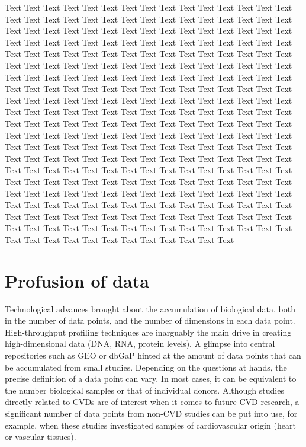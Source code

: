 \documentclass[letter]{bioinfo}
\begin{document}
Text Text Text Text Text Text  Text Text Text Text Text Text Text Text  Text Text Text Text Text Text Text Text  Text Text Text Text Text Text Text Text  Text Text Text Text Text Text Text Text  Text Text Text Text Text Text Text Text  Text Text Text Text Text Text Text Text  Text Text Text Text Text Text Text Text  Text Text Text Text Text Text Text Text  Text Text Text Text Text Text Text Text  Text Text Text Text Text Text Text Text  Text Text Text Text Text Text Text Text  Text Text Text Text Text Text Text Text  Text Text Text Text Text Text Text Text  Text Text Text Text Text Text Text Text  Text Text Text Text Text Text Text Text  Text Text Text Text Text Text Text Text  Text Text Text Text Text Text Text Text  Text Text Text Text Text Text Text Text  Text Text Text Text Text Text Text Text  Text Text Text Text Text Text Text Text  Text Text Text Text Text Text Text Text  Text Text Text Text Text Text Text Text  Text Text Text Text Text Text Text Text  Text Text Text Text Text Text Text Text  Text Text Text Text Text Text Text Text  Text Text Text Text Text Text Text Text  Text Text Text Text Text Text Text Text  Text Text Text Text Text Text Text Text  Text Text Text Text Text Text Text Text  Text Text Text Text Text Text Text Text  Text Text Text Text Text Text Text Text  Text Text Text Text Text Text Text Text  Text Text Text Text Text Text Text Text  Text Text Text Text Text Text Text Text  Text Text Text Text Text Text Text Text  Text Text Text Text Text Text Text Text  Text Text Text Text Text Text Text Text  Text Text Text Text Text Text Text Text  Text Text  

\section{Profusion of data}

Technological advances brought about the accumulation of biological data, both in the number of data points, and the number of dimensions in each data point.
High-throughput profiling techniques are inarguably the main drive in creating high-dimensional data (DNA, RNA, protein levels).
A glimpse into central repositories such as GEO or dbGaP hinted at the amount of data points that can be accumulated from small  studies. Depending on the questions at hands, the precise definition of a data point can vary. In most cases, it can be equivalent to the number biological samples or that of individual donors. Although studies directly related to CVDs are of interest when it comes to future CVD research, a significant number of data points from non-CVD studies can be put into use, for example, when these studies investigated samples of cardiovascular origin (heart or vascular tissues).
\end{document}
